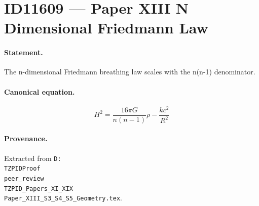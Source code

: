\section*{ID11609 --- Paper XIII N Dimensional Friedmann Law}

\paragraph{Statement.}
The n-dimensional Friedmann breathing law scales with the n(n-1) denominator.

\paragraph{Canonical equation.}
\[
H^2=\frac{16\pi G}{n(n-1)}\rho-\frac{kc^2}{R^2}
\]

\paragraph{Provenance.}
Extracted from \texttt{D:\\TZPIDProof\\peer\_review\\TZPID\_Papers\_XI\_XIX\\Paper\_XIII\_S3\_S4\_S5\_Geometry.tex}.
